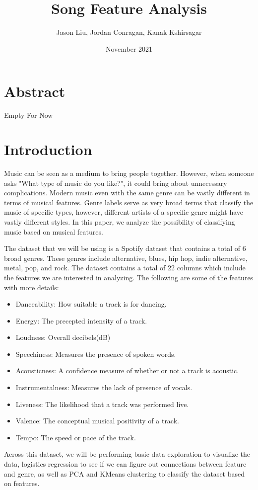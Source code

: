 \documentclass[11pt, a4paper, twocolumn]{article}
\title{Song Feature Analysis}
\author{Jason Liu, Jordan Conragan, Kanak Kshirsagar}
\date{November 2021}
\begin{document}
\maketitle
\section{Abstract}
Empty For Now
\section{Introduction}	
Music can be seen as a medium to bring people together. However, when someone asks "What type of music do you like?", it could bring about unnecessary complications. Modern music even with the same genre can be vastly different in terms of musical features. Genre labels serve as very broad terms that classify the music of specific types, however, different artists of a specific genre might have vastly different styles. In this paper, we analyze the possibility of classifying music based on musical features. 

The dataset that we will be using is a Spotify dataset that contains a total of 6 broad genres. These genres include alternative, blues, hip hop, indie alternative, metal, pop, and rock. The dataset contains a total of 22 columns which include the features we are interested in analyzing. The following are some of the features with more details:
\begin{itemize}
\item Danceability: How suitable a track is for dancing. 
\item Energy: The precepted intensity of a track. 
\item Loudness: Overall decibels(dB)
\item Speechiness: Measures the presence of spoken words.
\item Acousticness: A confidence measure of whether or not a track is acoustic. 
\item Instrumentalness: Measures the lack of presence of vocals. 
\item Liveness: The likelihood that a track was performed live.
\item Valence: The conceptual musical positivity of a track. 
\item Tempo: The speed or pace of the track. 
\end{itemize}

Across this dataset, we will be performing basic data exploration to visualize the data, logistics regression to see if we can figure out connections between feature and genre, as well as PCA and KMeans clustering to classify the dataset based on features. 
\end{document}
